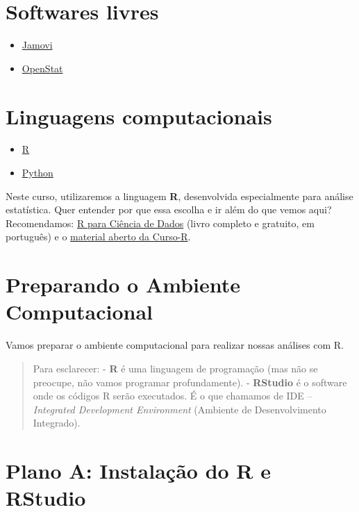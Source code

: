\documentclass[
]{book}
\providecommand{\tightlist}{%
  \setlength{\itemsep}{0pt}\setlength{\parskip}{0pt}}
\begin{document}
\section{Softwares livres}\label{softwares-livres}

\begin{itemize}
\tightlist
\item
  \href{https://www.jamovi.org}{Jamovi}
\item
  \href{https://openstat.info}{OpenStat}
\end{itemize}

\section{Linguagens computacionais}\label{linguagens-computacionais}

\begin{itemize}
\tightlist
\item
  \href{https://www.r-project.org}{R}
\item
  \href{https://www.python.org/}{Python}
\end{itemize}

Neste curso, utilizaremos a linguagem \textbf{R}, desenvolvida especialmente para análise estatística. Quer entender por que essa escolha e ir além do que vemos aqui? Recomendamos: \href{https://pt.r4ds.hadley.nz/}{R para Ciência de Dados} (livro completo e gratuito, em português) e o \href{https://www.curso-r.com/material/}{material aberto da Curso-R}.

\section{Preparando o Ambiente Computacional}\label{preparando-o-ambiente-computacional}

Vamos preparar o ambiente computacional para realizar nossas análises com R.

\begin{quote}
Para esclarecer:
- \textbf{R} é uma linguagem de programação (mas não se preocupe, não vamos programar profundamente).
- \textbf{RStudio} é o software onde os códigos R serão executados. É o que chamamos de IDE -- \emph{Integrated Development Environment} (Ambiente de Desenvolvimento Integrado).
\end{quote}

\section{Plano A: Instalação do R e RStudio}\label{plano-a-instalauxe7uxe3o-do-r-e-rstudio}
\end{document}
